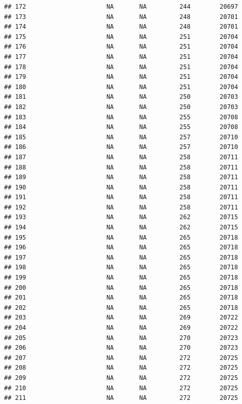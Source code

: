 \documentclass[
]{article}
\begin{document}
\begin{verbatim}
## 172                      NA       NA         244        20697
## 173                      NA       NA         248        20701
## 174                      NA       NA         248        20701
## 175                      NA       NA         251        20704
## 176                      NA       NA         251        20704
## 177                      NA       NA         251        20704
## 178                      NA       NA         251        20704
## 179                      NA       NA         251        20704
## 180                      NA       NA         251        20704
## 181                      NA       NA         250        20703
## 182                      NA       NA         250        20703
## 183                      NA       NA         255        20708
## 184                      NA       NA         255        20708
## 185                      NA       NA         257        20710
## 186                      NA       NA         257        20710
## 187                      NA       NA         258        20711
## 188                      NA       NA         258        20711
## 189                      NA       NA         258        20711
## 190                      NA       NA         258        20711
## 191                      NA       NA         258        20711
## 192                      NA       NA         258        20711
## 193                      NA       NA         262        20715
## 194                      NA       NA         262        20715
## 195                      NA       NA         265        20718
## 196                      NA       NA         265        20718
## 197                      NA       NA         265        20718
## 198                      NA       NA         265        20718
## 199                      NA       NA         265        20718
## 200                      NA       NA         265        20718
## 201                      NA       NA         265        20718
## 202                      NA       NA         265        20718
## 203                      NA       NA         269        20722
## 204                      NA       NA         269        20722
## 205                      NA       NA         270        20723
## 206                      NA       NA         270        20723
## 207                      NA       NA         272        20725
## 208                      NA       NA         272        20725
## 209                      NA       NA         272        20725
## 210                      NA       NA         272        20725
## 211                      NA       NA         272        20725

\end{verbatim}
\end{document}

